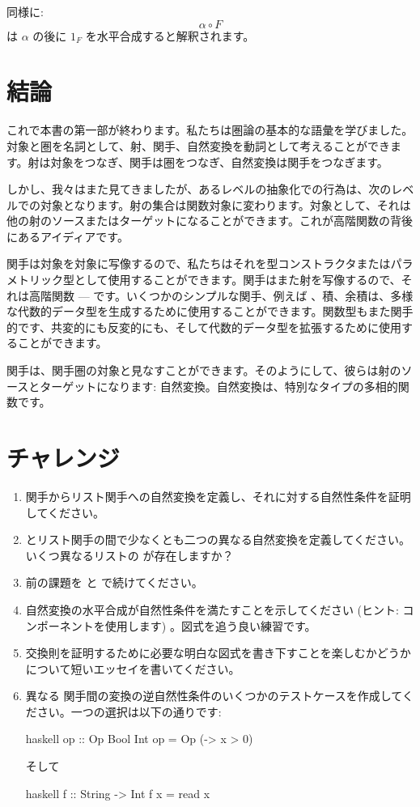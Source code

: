 同様に: 
\[\alpha \circ F\]
は $\alpha$ の後に $1_F$ を水平合成すると解釈されます。

\section{結論}

これで本書の第一部が終わります。私たちは圏論の基本的な語彙を学びました。対象と圏を名詞として、射、関手、自然変換を動詞として考えることができます。射は対象をつなぎ、関手は圏をつなぎ、自然変換は関手をつなぎます。

しかし、我々はまた見てきましたが、あるレベルの抽象化での行為は、次のレベルでの対象となります。射の集合は関数対象に変わります。対象として、それは他の射のソースまたはターゲットになることができます。これが高階関数の背後にあるアイディアです。

関手は対象を対象に写像するので、私たちはそれを型コンストラクタまたはパラメトリック型として使用することができます。関手はまた射を写像するので、それは高階関数 ---  です。いくつかのシンプルな関手、例えば 、積、余積は、多様な代数的データ型を生成するために使用することができます。関数型もまた関手的です、共変的にも反変的にも、そして代数的データ型を拡張するために使用することができます。

関手は、関手圏の対象と見なすことができます。そのようにして、彼らは射のソースとターゲットになります: 自然変換。自然変換は、特別なタイプの多相的関数です。

\section{チャレンジ}

\begin{enumerate}
  \tightlist
  \item
         関手からリスト関手への自然変換を定義し、それに対する自然性条件を証明してください。
  \item
         とリスト関手の間で少なくとも二つの異なる自然変換を定義してください。いくつ異なるリストの \code{()} が存在しますか？
  \item
        前の課題を  と  で続けてください。
  \item
        自然変換の水平合成が自然性条件を満たすことを示してください (ヒント: コンポーネントを使用します) 。図式を追う良い練習です。
  \item
        交換則を証明するために必要な明白な図式を書き下すことを楽しむかどうかについて短いエッセイを書いてください。
  \item
        異なる  関手間の変換の逆自然性条件のいくつかのテストケースを作成してください。一つの選択は以下の通りです: 

\begin{snip}{haskell}
op :: Op Bool Int
op = Op (\x -> x > 0)
\end{snip}
そして

\begin{snip}{haskell}
f :: String -> Int
f x = read x
\end{snip}
\end{enumerate}


